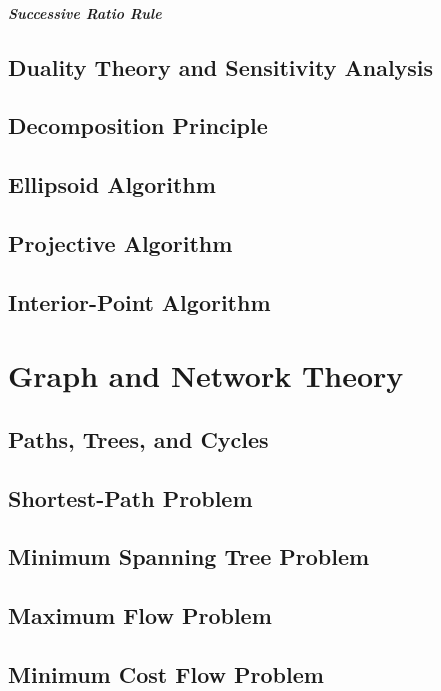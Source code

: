 \documentclass[10pt]{book}
\begin{document}
					\subsubsection{Successive Ratio Rule}

		\chapter{Duality Theory and Sensitivity Analysis}

		\chapter{Decomposition Principle}

		\chapter{Ellipsoid Algorithm}

		\chapter{Projective Algorithm}

		\chapter{Interior-Point Algorithm}

	\part{Graph and Network Theory}
		\chapter{Paths, Trees, and Cycles}

		\chapter{Shortest-Path Problem}

		\chapter{Minimum Spanning Tree Problem}

		\chapter{Maximum Flow Problem}

		\chapter{Minimum Cost Flow Problem}
\end{document}

